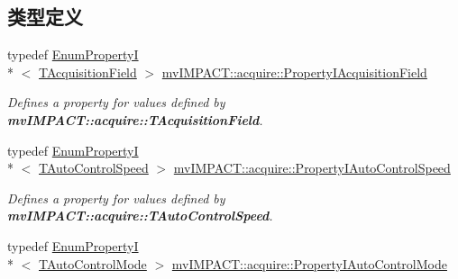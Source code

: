 \subsection*{类型定义}
\begin{DoxyCompactItemize}
\item 
\hypertarget{group___device_specific_interface_ga01090436ef6969d1fedb45ce24f68d9b}{typedef \hyperlink{classmv_i_m_p_a_c_t_1_1acquire_1_1_enum_property_i}{Enum\+Property\+I}\\*
$<$ \hyperlink{group___device_specific_interface_gac2b87599c04c1ca9aa8c8a412c8a5518}{T\+Acquisition\+Field} $>$ \hyperlink{group___device_specific_interface_ga01090436ef6969d1fedb45ce24f68d9b}{mv\+I\+M\+P\+A\+C\+T\+::acquire\+::\+Property\+I\+Acquisition\+Field}}\label{group___device_specific_interface_ga01090436ef6969d1fedb45ce24f68d9b}

\begin{DoxyCompactList}\small\item\em Defines a property for values defined by {\bfseries mv\+I\+M\+P\+A\+C\+T\+::acquire\+::\+T\+Acquisition\+Field}. \end{DoxyCompactList}\item 
\hypertarget{group___device_specific_interface_ga8b56e568f48f677546ec6dc38012e108}{typedef \hyperlink{classmv_i_m_p_a_c_t_1_1acquire_1_1_enum_property_i}{Enum\+Property\+I}\\*
$<$ \hyperlink{group___device_specific_interface_ga363635dbd1401b0d852e9918eba2187f}{T\+Auto\+Control\+Speed} $>$ \hyperlink{group___device_specific_interface_ga8b56e568f48f677546ec6dc38012e108}{mv\+I\+M\+P\+A\+C\+T\+::acquire\+::\+Property\+I\+Auto\+Control\+Speed}}\label{group___device_specific_interface_ga8b56e568f48f677546ec6dc38012e108}

\begin{DoxyCompactList}\small\item\em Defines a property for values defined by {\bfseries mv\+I\+M\+P\+A\+C\+T\+::acquire\+::\+T\+Auto\+Control\+Speed}. \end{DoxyCompactList}\item 
\hypertarget{group___device_specific_interface_ga692ee7a4c1a557177eba5b66deed4c2d}{typedef \hyperlink{classmv_i_m_p_a_c_t_1_1acquire_1_1_enum_property_i}{Enum\+Property\+I}\\*
$<$ \hyperlink{group___device_specific_interface_gaa686f613e70c03c31a58674a71fb318d}{T\+Auto\+Control\+Mode} $>$ \hyperlink{group___device_specific_interface_ga692ee7a4c1a557177eba5b66deed4c2d}{mv\+I\+M\+P\+A\+C\+T\+::acquire\+::\+Property\+I\+Auto\+Control\+Mode}}\label{group___device_specific_interface_ga692ee7a4c1a557177eba5b66deed4c2d}


\end{DoxyCompactItemize}
